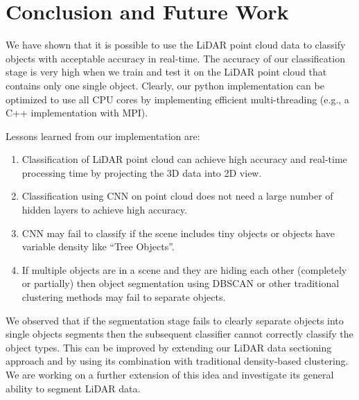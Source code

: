 \section{Conclusion and Future Work}\label{sec:conclusion}
We have shown that it is possible to use the LiDAR point cloud data to classify objects with
acceptable accuracy in real-time. The accuracy of our classification stage is very high when we train and test it on the LiDAR point cloud that contains only one single object. Clearly, our python implementation can be optimized to
use all CPU cores by implementing efficient multi-threading (e.g., a C++ implementation with MPI).

Lessons learned from our implementation are:
\begin{enumerate}
  \item Classification of LiDAR point cloud can achieve high accuracy and real-time processing time by projecting the 3D data into 2D view.
  \item Classification using CNN on point cloud does not need a large number of hidden layers to achieve high accuracy.
  \item CNN may fail to classify if the scene includes tiny objects or objects have variable density like ``Tree Objects''.
  \item If multiple objects are in a scene and they are hiding each other (completely or partially) then object segmentation using DBSCAN
  or other traditional clustering methods may fail to separate objects.
\end{enumerate}

We observed that if the segmentation stage fails to clearly separate objects into single objects segments then the subsequent classifier cannot correctly classify the object types. This can be improved by extending our LiDAR data sectioning approach and by using its combination with traditional density-based clustering. We are working on a further extension of this idea and investigate its general ability to segment LiDAR data.
